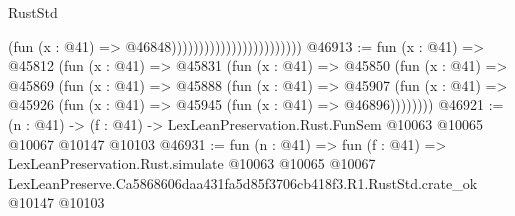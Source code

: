 \begin{lexlean}{RustStd}
\begin{coremodule}
                                                  (fun (x : @41) => @46848))))))))))))))))))))))))
@46913 := fun (x : @41) =>
  @45812
    (fun (x : @41) =>
    @45831
      (fun (x : @41) =>
      @45850
        (fun (x : @41) =>
        @45869
          (fun (x : @41) =>
          @45888
            (fun (x : @41) =>
            @45907
              (fun (x : @41) => @45926 (fun (x : @41) => @45945 (fun (x : @41) => @46896))))))))
@46921 := (n : @41) ->
  (f : @41) -> LexLeanPreservation.Rust.FunSem @10063 @10065 @10067 @10147 @10103
@46931 := fun (n : @41) =>
  fun (f : @41) =>
  LexLeanPreservation.Rust.simulate
    @10063
    @10065
    @10067
    LexLeanPreserve.Ca5868606daa431fa5d85f3706cb418f3.R1.RustStd.crate_ok
    @10147
    @10103
\end{coremodule}
\end{lexlean}
